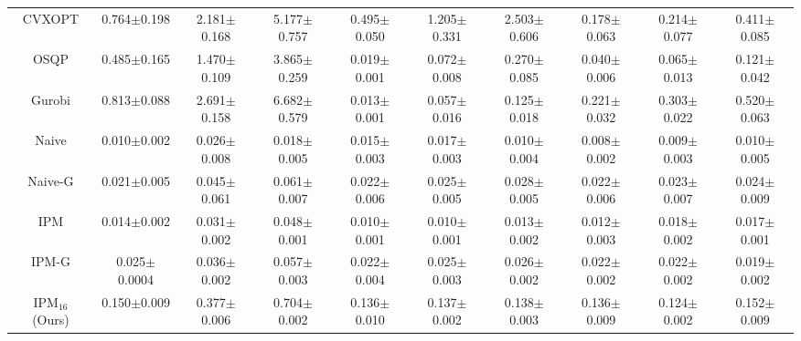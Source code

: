 \begin{table*}[t]
{\begin{tabular}{c|ccc|ccc|ccc}
\midrule
CVXOPT & 0.764\scriptsize$\pm$0.198 & 2.181\scriptsize$\pm$0.168 & 5.177\scriptsize$\pm$0.757 
& 0.495\scriptsize$\pm$0.050 & 1.205\scriptsize$\pm$0.331 & 2.503\scriptsize$\pm$0.606 
& 0.178\scriptsize$\pm$0.063 & 0.214\scriptsize$\pm$0.077 & 0.411\scriptsize$\pm$0.085 \\
OSQP & 0.485\scriptsize$\pm$0.165 & 1.470\scriptsize$\pm$0.109 & 3.865\scriptsize$\pm$0.259 
& 0.019\scriptsize$\pm$0.001 & 0.072\scriptsize$\pm$0.008 & 0.270\scriptsize$\pm$0.085 
& 0.040\scriptsize$\pm$0.006 & 0.065\scriptsize$\pm$0.013 & 0.121\scriptsize$\pm$0.042 \\
Gurobi & 0.813\scriptsize$\pm$0.088 & 2.691\scriptsize$\pm$0.158 & 6.682\scriptsize$\pm$0.579 
& 0.013\scriptsize$\pm$0.001 & 0.057\scriptsize$\pm$0.016 & 0.125\scriptsize$\pm$0.018 
& 0.221\scriptsize$\pm$0.032 & 0.303\scriptsize$\pm$0.022 & 0.520\scriptsize$\pm$0.063 \\
\midrule
Naive \citeyear{chen2024qp} & 0.010\scriptsize$\pm$0.002 & 0.026\scriptsize$\pm$0.008 & 0.018\scriptsize$\pm$0.005 
& 0.015\scriptsize$\pm$0.003 & 0.017\scriptsize$\pm$0.003 & 0.010\scriptsize$\pm$0.004 
& 0.008\scriptsize$\pm$0.002 & 0.009\scriptsize$\pm$0.003 & 0.010\scriptsize$\pm$0.005 \\
Naive-G \citeyear{chen2024qp} & 0.021\scriptsize$\pm$0.005 & 0.045\scriptsize$\pm$0.061 & 0.061\scriptsize$\pm$0.007 & 0.022\scriptsize$\pm$0.006 & 0.025\scriptsize$\pm$0.005 & 0.028\scriptsize$\pm$0.005 & 0.022\scriptsize$\pm$0.006 & 0.023\scriptsize$\pm$0.007 & 0.024\scriptsize$\pm$0.009\\
\midrule
IPM \citeyear{pmlr-v238-qian24a} & 0.014\scriptsize$\pm$0.002 & 0.031\scriptsize$\pm$0.002 & 0.048\scriptsize$\pm$0.001 & 0.010\scriptsize$\pm$0.001 & 0.010\scriptsize$\pm$0.001 & 0.013\scriptsize$\pm$0.002 & 0.012\scriptsize$\pm$0.003 & 0.018\scriptsize$\pm$0.002 & 0.017\scriptsize$\pm$0.001 \\
IPM-G \citeyear{pmlr-v238-qian24a} & 0.025\scriptsize$\pm$0.0004 & 0.036\scriptsize$\pm$0.002 & 0.057\scriptsize$\pm$0.003 
& 0.022\scriptsize$\pm$0.004 & 0.025\scriptsize$\pm$0.003 & 0.026\scriptsize$\pm$0.002 
& 0.022\scriptsize$\pm$0.002 & 0.022\scriptsize$\pm$0.002 & 0.019\scriptsize$\pm$0.002 \\
\midrule
IPM$_{16}$ (Ours) & 0.150\scriptsize$\pm$0.009 & 0.377\scriptsize$\pm$0.006 & 0.704\scriptsize$\pm$0.002 & 0.136\scriptsize$\pm$0.010 & 0.137\scriptsize$\pm$0.002 & 0.138\scriptsize$\pm$0.003 & 0.136\scriptsize$\pm$0.009 & 0.124\scriptsize$\pm$0.002 & 0.152\scriptsize$\pm$0.009\\

\end{tabular}}
\end{table*}
